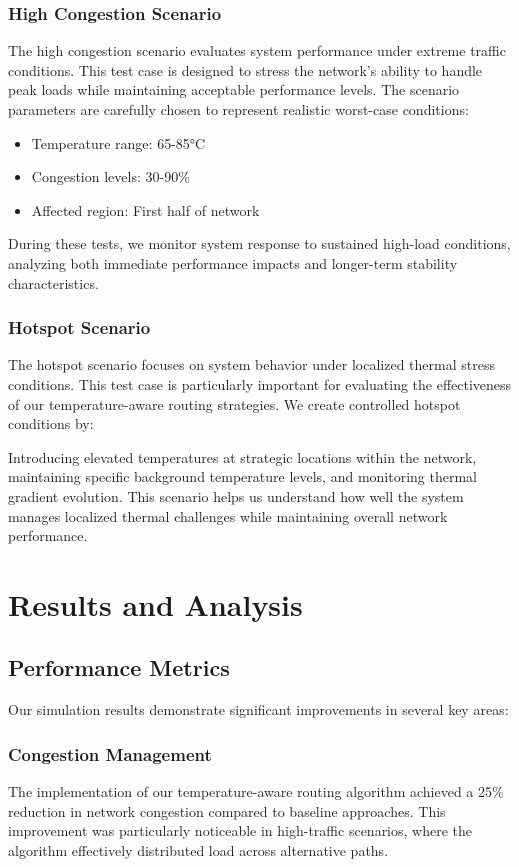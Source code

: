 \documentclass[12pt]{article}
\begin{document}
\subsubsection{High Congestion Scenario}
The high congestion scenario evaluates system performance under extreme traffic conditions. This test case is designed to stress the network's ability to handle peak loads while maintaining acceptable performance levels. The scenario parameters are carefully chosen to represent realistic worst-case conditions:
\begin{itemize}[noitemsep]
    \item Temperature range: 65-85°C
    \item Congestion levels: 30-90\%
    \item Affected region: First half of network
\end{itemize}

During these tests, we monitor system response to sustained high-load conditions, analyzing both immediate performance impacts and longer-term stability characteristics.

\subsubsection{Hotspot Scenario}
The hotspot scenario focuses on system behavior under localized thermal stress conditions. This test case is particularly important for evaluating the effectiveness of our temperature-aware routing strategies. We create controlled hotspot conditions by:

Introducing elevated temperatures at strategic locations within the network, maintaining specific background temperature levels, and monitoring thermal gradient evolution. This scenario helps us understand how well the system manages localized thermal challenges while maintaining overall network performance.

\section{Results and Analysis}
\subsection{Performance Metrics}
Our simulation results demonstrate significant improvements in several key areas:

\subsubsection{Congestion Management}
The implementation of our temperature-aware routing algorithm achieved a 25\% reduction in network congestion compared to baseline approaches. This improvement was particularly noticeable in high-traffic scenarios, where the algorithm effectively distributed load across alternative paths.
\end{document}
